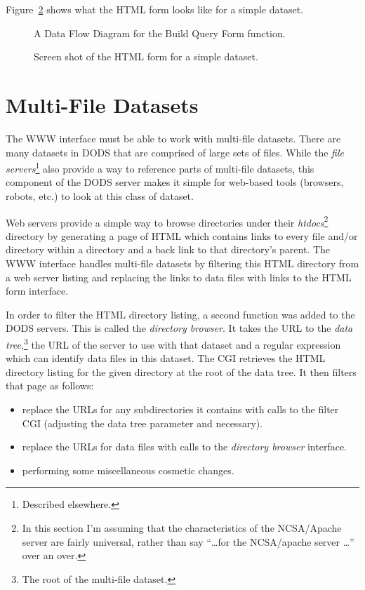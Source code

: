 \documentclass{article}
\begin{document}
Figure~\ref{fig:screen} shows what the HTML form looks like for a simple
dataset. 

\begin{figure}
\centerline{}
\caption{A Data Flow Diagram for the Build Query Form function.}
\label{fig:build}
\end{figure}

\begin{figure}
\centerline{}
\caption{Screen shot of the HTML form for a simple dataset.}
\label{fig:screen}
\end{figure}

\section{Multi-File Datasets}
\label{sec:multifile}

The WWW interface must be able to work with multi-file datasets. There are
many datasets in DODS that are comprised of large sets of files. While the
\emph{file servers}\footnote{Described elsewhere.} also provide a way to
reference parts of multi-file datasets, this component of the DODS server
makes it simple for web-based tools (browsers, robots, etc.) to look at this
class of dataset.

Web servers provide a simple way to browse directories under their {\em
  htdocs}\footnote{In this section I'm assuming that the characteristics of
  the NCSA/Apache server are fairly universal, rather than say ``\ldots for
  the NCSA/apache server \ldots'' over an over.} directory by generating a
page of HTML which contains links to every file and/or directory within a
directory and a back link to that directory's parent. The WWW interface
handles multi-file datasets by filtering this HTML directory from a web
server listing and replacing the links to data files with links to the HTML
form interface.

In order to filter the HTML directory listing, a second function was added to
the DODS servers. This is called the \emph{directory browser}. It takes the URL
to the {\em data tree},\footnote{The root of the multi-file dataset.} the URL
of the server to use with that dataset and a regular expression which can
identify data files in this dataset. The CGI retrieves the HTML directory
listing for the given directory at the root of the data tree. It then filters
that page as follows:

\begin{itemize}
  
\item replace the URLs for any subdirectories it contains with calls to the
  filter CGI (adjusting the data tree parameter and necessary).
  
\item replace the URLs for data files with calls to the \emph{directory
    browser} interface.

\item performing some miscellaneous cosmetic changes.

\end{itemize}
\end{document}
